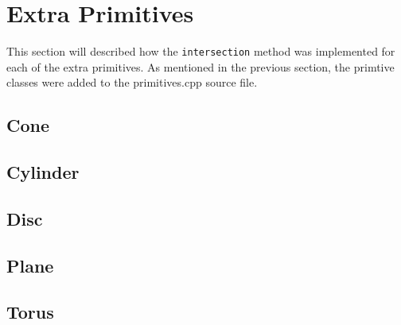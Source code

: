 \section{Extra Primitives}

This section will described how the \verb|intersection| method was
implemented for each of the extra primitives. As mentioned in the previous
section, the primtive classes were added to the primitives.cpp source file.

\subsection*{Cone}
\lipsum[1]

\subsection*{Cylinder}

\subsection*{Disc}

\subsection*{Plane}

\subsection*{Torus}

